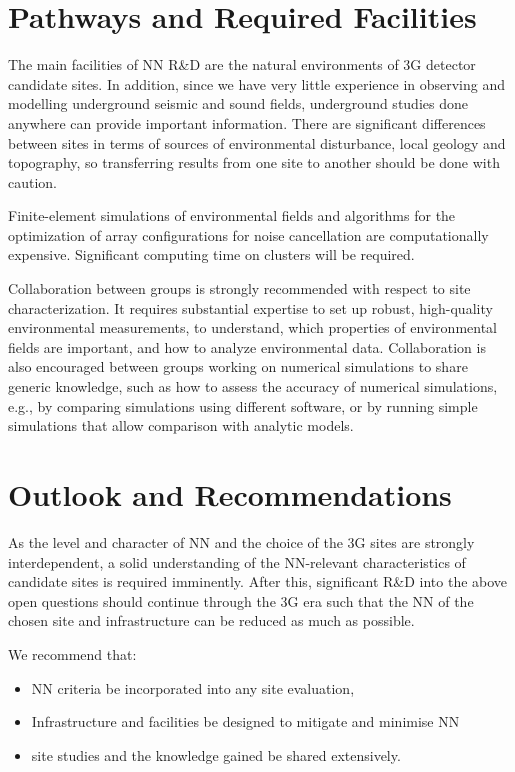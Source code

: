 \section{Pathways and Required Facilities}
The main facilities of NN R\&D are the natural environments of 3G detector candidate sites. In addition, since we have very little experience in observing and modelling underground seismic and sound fields, underground studies done anywhere can provide important information. There are significant differences between sites in terms of sources of environmental disturbance, local geology and topography, so transferring results from one site to another should be done with caution.

Finite-element simulations of environmental fields and algorithms for the optimization of array configurations for noise cancellation are computationally expensive. Significant computing time on clusters will be required. 

Collaboration between groups is strongly recommended with respect to site characterization. It requires substantial expertise to set up robust, high-quality environmental measurements, to understand, which properties of environmental fields are important, and how to analyze environmental data. Collaboration is also encouraged between groups working on numerical simulations to share generic knowledge, such as how to assess the accuracy of numerical simulations, e.g., by comparing simulations using different software, or by running simple simulations that allow comparison with analytic models.

\section{Outlook and Recommendations}

As the level and character of NN and the choice of the 3G sites are strongly interdependent, a solid understanding of the NN-relevant characteristics of candidate sites is required imminently. After this, significant R\&D into the above open questions should continue through the 3G era such that the NN of the chosen site and infrastructure can be reduced as much as possible. 

We recommend that:
\begin{itemize}
\item NN criteria be incorporated into any site evaluation,
\item Infrastructure and facilities be designed to mitigate and minimise NN 
\item site studies and the knowledge  gained be shared extensively.
\end{itemize}


